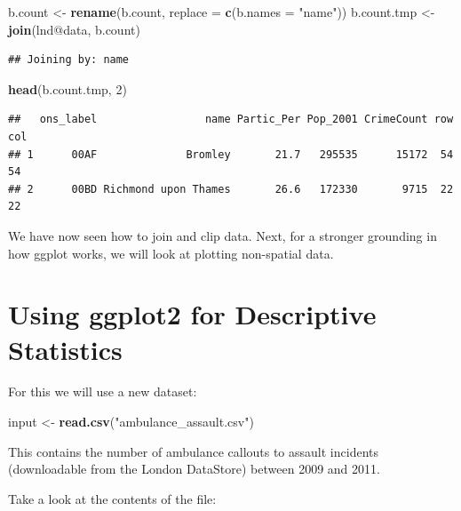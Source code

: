 \documentclass[]{article}
\newenvironment{Shaded}{}{}
\newcommand{\KeywordTok}[1]{\textcolor[rgb]{0.00,0.44,0.13}{\textbf{{#1}}}}
\newcommand{\DataTypeTok}[1]{\textcolor[rgb]{0.56,0.13,0.00}{{#1}}}
\newcommand{\DecValTok}[1]{\textcolor[rgb]{0.25,0.63,0.44}{{#1}}}
\newcommand{\StringTok}[1]{\textcolor[rgb]{0.25,0.44,0.63}{{#1}}}
\newcommand{\NormalTok}[1]{{#1}}
\begin{document}
\begin{Shaded}
\begin{Highlighting}[]
\NormalTok{b.count <- }\KeywordTok{rename}\NormalTok{(b.count, }\DataTypeTok{replace =} \KeywordTok{c}\NormalTok{(}\DataTypeTok{b.names =} \StringTok{"name"}\NormalTok{))}
\NormalTok{b.count.tmp <- }\KeywordTok{join}\NormalTok{(lnd@data, b.count)}
\end{Highlighting}
\end{Shaded}
\begin{verbatim}
## Joining by: name
\end{verbatim}
\begin{Shaded}
\begin{Highlighting}[]
\KeywordTok{head}\NormalTok{(b.count.tmp, }\DecValTok{2}\NormalTok{)}
\end{Highlighting}
\end{Shaded}
\begin{verbatim}
##   ons_label                 name Partic_Per Pop_2001 CrimeCount row col
## 1      00AF              Bromley       21.7   295535      15172  54  54
## 2      00BD Richmond upon Thames       26.6   172330       9715  22  22
\end{verbatim}
\begin{Shaded}
\end{Shaded}
We have now seen how to join and clip data. Next, for a stronger
grounding in how ggplot works, we will look at plotting non-spatial
data.

\section{Using ggplot2 for Descriptive Statistics}

For this we will use a new dataset:

\begin{Shaded}
\begin{Highlighting}[]
\NormalTok{input <- }\KeywordTok{read.csv}\NormalTok{(}\StringTok{"ambulance_assault.csv"}\NormalTok{)}
\end{Highlighting}
\end{Shaded}
This contains the number of ambulance callouts to assault incidents
(downloadable from the London DataStore) between 2009 and 2011.

Take a look at the contents of the file:
\end{document}
